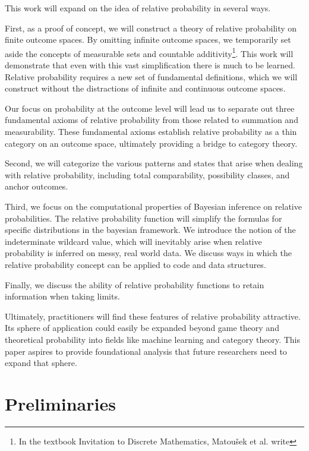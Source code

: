 \documentclass[twoside]{article}
\theoremstyle{plain}%
\theoremstyle{definition}
\theoremstyle{remark}
\begin{document}
This work will expand on the idea of relative probability in several ways.

First, as a proof of concept, we will construct a theory of relative probability on finite outcome spaces. By omitting infinite outcome spaces, we temporarily set aside the concepts of measurable sets and countable additivity\footnote{In the textbook Invitation to Discrete Mathematics, Matoušek et al. write }. This work will demonstrate that even with this vast simplification there is much to be learned. Relative probability requires a new set of fundamental definitions, which we will construct without the distractions of infinite and continuous outcome spaces.

Our focus on probability at the outcome level will lead us to separate out three fundamental axioms of relative probability from those related to summation and measurability. These fundamental axioms establish relative probability as a thin category on an outcome space, ultimately providing a bridge to category theory.

Second, we will categorize the various patterns and states that arise when dealing with relative probability, including total comparability, possibility classes, and anchor outcomes. 

Third, we focus on the computational properties of Bayesian inference on relative probabilities. The relative probability function will simplify the formulas for specific distributions in the bayesian framework. We introduce the notion of the indeterminate wildcard value, which will inevitably arise when relative probability is inferred on messy, real world data. We discuss ways in which the relative probability concept can be applied to code and data structures.

Finally, we discuss the ability of relative probability functions to retain information when taking limits.

Ultimately, practitioners will find these features of relative probability attractive. Its sphere of application could easily be expanded beyond game theory and theoretical probability into fields like machine learning and category theory. This paper aspires to provide foundational analysis that future researchers need to expand that sphere.

\section{Preliminaries}
\end{document}

